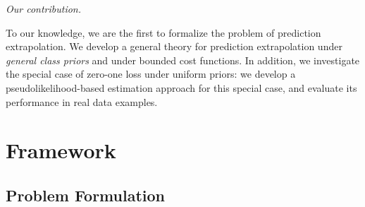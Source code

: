 \documentclass[12pt]{article}
\begin{document}
\noindent\emph{Our contribution.}

To our knowledge, we are the first to formalize the problem of
prediction extrapolation.  We develop a general theory for prediction
extrapolation under \emph{general class priors} and under bounded cost
functions.  In addition, we investigate the special case of zero-one
loss under uniform priors: we develop a pseudolikelihood-based
estimation approach for this special case, and evaluate its
performance in real data examples.







\section{Framework}\label{sec:formulation}

\subsection{Problem Formulation}


\end{document}
